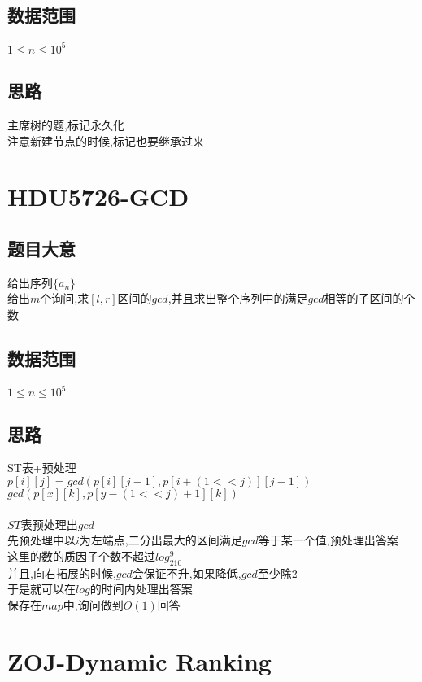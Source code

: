 \documentclass{ctexart}
\numberwithin{equation}{section}
\begin{document}
\begin{flushleft}
  \subsection{数据范围}
  $1\le n\le 10^5$\\
  \subsection{思路}
  主席树的题,标记永久化\\
  注意新建节点的时候,标记也要继承过来
  \newpage

  \section{HDU5726-GCD}
  \subsection{题目大意}
  给出序列$\{a_n\}$\\
  给出$m$个询问,求$[l,r]$区间的$gcd$,并且求出整个序列中的满足$gcd$相等的子区间的个数\\
  \subsection{数据范围}
  $1\le n\le 10^5$\\
  \subsection{思路}
  ST表+预处理\\
  $p[i][j] = gcd(p[i][j-1], p[i+(1<<j)][j-1])$\\
  $gcd(p[x][k], p[y-(1<<j)+1][k])$\\

  ~\\
  
  $ST$表预处理出$gcd$\\
  先预处理中以$i$为左端点,二分出最大的区间满足$gcd$等于某一个值,预处理出答案\\
  这里的数的质因子个数不超过$log_210^9$\\
  并且,向右拓展的时候,$gcd$会保证不升,如果降低,$gcd$至少除2\\
  于是就可以在$log$的时间内处理出答案\\
  保存在$map$中,询问做到$O(1)$回答\\
  \newpage

  \section{ZOJ-Dynamic Ranking}

\end{flushleft}
\end{document}
